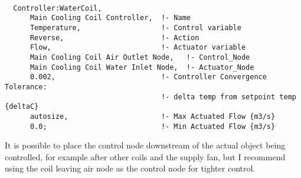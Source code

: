 \begin{lstlisting}

  Controller:WaterCoil,
      Main Cooling Coil Controller,  !- Name
      Temperature,                   !- Control variable
      Reverse,                       !- Action
      Flow,                          !- Actuator variable
      Main Cooling Coil Air Outlet Node,   !- Control_Node
      Main Cooling Coil Water Inlet Node,  !- Actuator_Node
      0.002,                         !- Controller Convergence Tolerance:
                                     !- delta temp from setpoint temp {deltaC}
      autosize,                      !- Max Actuated Flow {m3/s}
      0.0;                           !- Min Actuated Flow {m3/s}
\end{lstlisting}

It is possible to place the control node downstream of the actual object being controlled, for example after other coils and the supply fan, but I recommend using the coil leaving air node as the control node for tighter control.
